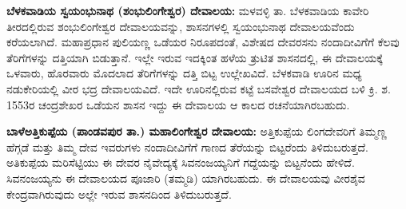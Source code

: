 \textbf{ಬೆಳಕವಾಡಿಯ ಸ್ವಯಂಭುನಾಥ (ಶಂಭುಲಿಂಗೇಶ್ವರ) ದೇವಾಲಯ:} ಮಳವಳ್ಳಿ ತಾ. ಬೆಳಕವಾಡಿಯ ಕಾವೇರಿ ತೀರದಲ್ಲಿರುವ ಶಂಭುಲಿಂಗೇಶ್ವರ ದೇವಾಲಯ\-ವನ್ನು, ಶಾಸನಗಳಲ್ಲಿ ಸ್ವಯಂಭುನಾಥ ದೇವಾಲಯವೆಂದು ಕರೆಯಲಾಗಿದೆ. ಮಹಾಪ್ರಧಾನ ಪುಲಿಯಣ್ಣ ಒಡೆಯರ ನಿರೂಪದಂತೆ, ವಿಶೇಷದ ದೇವರಸನು ನಂದಾದೀವಿಗೆಗೆ ಕೆಲವು ತೆರಿಗೆಗಳನ್ನು ದತ್ತಿಯಾಗಿ ಬಿಡುತ್ತಾನೆ. ಇಲ್ಲೇ ಇರುವ ಇದಕ್ಕಿಂತ ಹಳೆಯ ತ್ರುಟಿತ ಶಾಸನದಲ್ಲಿ, ಈ ದೇವಾಲಯಕ್ಕೆ ಒಳವಾರು, ಹೊರವಾರು ಮೊದಲಾದ ತೆರಿಗೆಗಳನ್ನು ದತ್ತಿ ಬಿಟ್ಟ ಉಲ್ಲೇಖವಿದೆ. ಬೆಳಕವಾಡಿ ಊರಿನ ಮಧ್ಯ ನಡುಕೇರಿಯಲ್ಲಿ ವೀರ ಭದ್ರ ದೇವಾಲಯವಿದೆ. ಇದೇ ಊರಿನಲ್ಲಿರುವ ಕಟ್ಟೆ ಬಸವೇಶ್ವರ ದೇವಾಲಯದ ಬಳಿ ಕ್ರಿ. ಶ. 1553ರ ಚಂದ್ರಶೇಖರ ಒಡೆಯನ ಶಾಸನ ಇದ್ದು ಈ ದೇವಾಲಯ ಆ ಕಾಲದ ರಚನೆಯಾಗಿರಬಹುದು.

\textbf{ಬಾಳೆಅತ್ತಿಕುಪ್ಪೆಯ (ಪಾಂಡವಪುರ ತಾ.) ಮಹಾಲಿಂಗೇಶ್ವರ ದೇವಾಲಯ:} ಅತ್ತಿಕುಪ್ಪೆಯ ಲಿಂಗದೇವರಿಗೆ ತಿಮ್ಮಣ್ಣ ಹೆಗ್ಗಡೆ ಮತ್ತು ತಿಮ್ಮ ದೇವ ಇವರುಗಳು ನಂದಾದೀವಿಗೆಗೆ ಗಾಣದ ತೆರೆಯನ್ನು ಬಿಟ್ಟರೆಂದು ತಿಳಿದುಬರುತ್ತದೆ. ಅತಿಕುಪ್ಪೆಯ ಮರಿಸೆಟ್ಟಿಯು ಈ ದೇವರ ನೈವೇದ್ಯಕ್ಕೆ ಸಿವನಂಜಯ್ಯನಿಗೆ ಗದ್ದೆಯನ್ನು ಬಿಟ್ಟನೆಂದು ಹೇಳಿದೆ. ಸಿವನಂಜಯ್ಯನು ಈ ದೇವಾಲಯದ ಪೂಜಾರಿ (ತಮ್ಮಡಿ) ಯಾಗಿರಬಹುದು. ಈ ದೇವಾಲಯವು ವೀರಶೈವ ಕೇಂದ್ರವಾಗಿರುವುದು ಅಲ್ಲೇ ಇರುವ ಶಾಸನದಿಂದ ತಿಳಿದುಬರುತ್ತದೆ.

